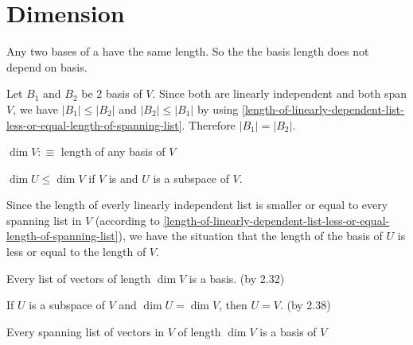 \section{Dimension}

\setcounter{thm}{33}
\begin{thm} Any two bases of a \fdvs have the same length. So the the basis length does not depend on basis.
\end{thm}
\begin{prf}
  Let $B_1$ and $B_2$ be $2$ basis of $V$. Since both are linearly independent and both span $V$, we have $|B_1| \leq |B_2|$ and $|B_2| \leq |B_1|$ by using \ref{length-of-linearly-dependent-list-less-or-equal-length-of-spanning-list}. Therefore $|B_1|=|B_2|.$
\end{prf}

\begin{mydef} [Dimension]
	$\dim V :\equiv$ length of any basis of $V$
\end{mydef}

\setcounter{thm}{36}
\begin{thm} 
  \label{dimension-of-a-subspace}
  $\dim U \leq \dim V$ if $V$ is \fd  and $U$ is a subspace of $V$.
\end{thm}

\begin{prf}
  Since the length of everly linearly independent list is smaller or equal to every spanning list in $V$ (according to \ref{length-of-linearly-dependent-list-less-or-equal-length-of-spanning-list}), we have the situation that the length of the basis of $U$ is less or equal to the length of $V$.
\end{prf}

\begin{thm}
  \label{every-lid-list-of-length-dim-v-is -a-basis-of-v}
  Every \lid list of vectors of length $\dim V$ is a basis. (by 2.32)
\end{thm}

\begin{thm} If $U$ is a subspace of $V$ and $\dim U = \dim V$, then $U=V$. (by 2.38)
\end{thm}

\setcounter{thm}{41} 
\begin{thm}
  Every spanning list of vectors in $V$ of length $\dim V$ is a basis of $V$
\end{thm}


